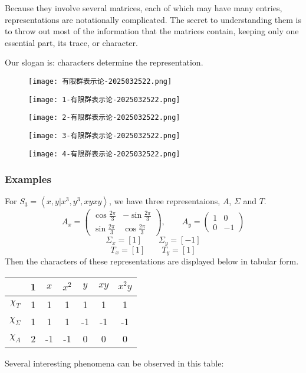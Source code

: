 Because they involve several matrices, each of which may have many entries, representations are notationally complicated. The secret to understanding them is to throw out most of the information that the matrices contain, keeping only one essential part, its trace, or character.

Our slogan is: characters determine the representation.
\begin{figure}[H]
\centering
\texttt{[image: 有限群表示论-2025032522.png]}
\label{}
\end{figure}
\begin{figure}[H]
\centering
\texttt{[image: 1-有限群表示论-2025032522.png]}
\label{}
\end{figure}
\begin{figure}[H]
\centering
\texttt{[image: 2-有限群表示论-2025032522.png]}
\label{}
\end{figure}
\begin{figure}[H]
\centering
\texttt{[image: 3-有限群表示论-2025032522.png]}
\label{}
\end{figure}
\begin{figure}[H]
\centering
\texttt{[image: 4-有限群表示论-2025032522.png]}
\label{}
\end{figure}

\subsubsection{Examples}

For $S_3= \left< x,y|x^3,y^3,xyxy \right>$, we have three representaions, $A$, $\Sigma$ and $T$.
\[
A_{x}=\begin{pmatrix}
\cos\frac{2\pi }{3} & -\sin\frac{2\pi}{3} \\
\sin\frac{2\pi}{3} & \cos\frac{2\pi}{3}
\end{pmatrix},\qquad A_{y}=\begin{pmatrix}
1 & 0 \\
0  & -1
\end{pmatrix}
\]
\[
\Sigma_{x}=[1]\qquad \Sigma_{y}=[-1]
\]
\[
T_{x}=[1]\qquad T_{y}=[1]
\]
Then the characters of these representations are displayed below in tabular form.

\begin{table}[h]
	\centering
	\begin{tabular}{|c|c|c|c|c|c|c|}
		\hline
		 & 1 & $x$ & $x^2$ & $y$ & $x y$ & $x^2 y$ \\
		\hline
		$\chi_T$ & 1 & 1 & 1 & 1 & 1 & 1 \\
		\hline
		$\chi_{\Sigma}$ & 1 & 1 & 1 & -1 & -1 & -1 \\
		\hline
		$\chi_A$ & 2 & -1 & -1 & 0 & 0 & 0 \\
		\hline
	\end{tabular}
\end{table}
Several interesting phenomena can be observed in this table:

